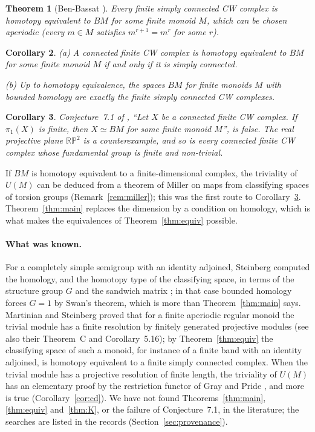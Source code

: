 \documentclass[11pt,a4paper]{article}
\newtheorem{theorem}{Theorem}[section]
\newtheorem{corollary}[theorem]{Corollary}
\theoremstyle{definition}
\newcommand{\RP}{\mathbb{RP}}
\begin{document}
\begin{theorem}[Ben-Bassat {\cite[Theorem~C]{BB}}]\label{thm:BB}
Every finite simply connected CW complex is homotopy equivalent to $BM$ for
some finite monoid $M$, which can be chosen aperiodic \textup{(}every $m\in M$
satisfies $m^{r+1}=m^r$ for some $r$\textup{)}.
\end{theorem}

\begin{corollary}\label{cor:class}
\textup{(a)} A connected finite CW complex is homotopy equivalent to $BM$ for
some finite monoid $M$ if and only if it is simply connected.

\textup{(b)} Up to homotopy equivalence, the spaces $BM$ for finite monoids
$M$ with bounded homology are exactly the finite simply connected CW
complexes.
\end{corollary}

\begin{corollary}\label{cor:conj}
Conjecture~7.1 of \cite{BB}, ``Let $X$ be a connected finite CW complex. If
$\pi_1(X)$ is finite, then $X\simeq BM$ for some finite monoid $M$'', is
false. The real projective plane $\RP^2$ is a counterexample, and so is every
connected finite CW complex whose fundamental group is finite and non-trivial.
\end{corollary}

If $BM$ is homotopy equivalent to a finite-dimensional complex, the
triviality of $U(M)$ can be deduced from a theorem of Miller on maps from
classifying spaces of torsion groups (Remark~\ref{rem:miller}); this was the
first route to Corollary~\ref{cor:conj}. Theorem~\ref{thm:main} replaces the
dimension by a condition on homology, which is what makes the equivalences of
Theorem~\ref{thm:equiv} possible.

\paragraph{What was known.} For a completely simple semigroup with an
identity adjoined, Steinberg computed the homology, and the homotopy type of
the classifying space, in terms of the structure group $G$ and the sandwich
matrix \cite[Theorem~A and Theorem~3.1]{St}; in that case bounded homology
forces $G=1$ by Swan's theorem, which is more than Theorem~\ref{thm:main}
says. Martinian and Steinberg proved that for a finite aperiodic regular
monoid the trivial module has a finite resolution by finitely generated
projective modules \cite[Corollary~5.15]{MS} (see also their Theorem~C and
Corollary~5.16); by Theorem~\ref{thm:equiv} the classifying space of such a
monoid, for instance of a finite band with an identity adjoined, is homotopy
equivalent to a finite simply connected complex. When the trivial module has
a projective resolution of finite length, the triviality of $U(M)$ has an
elementary proof by the restriction functor of Gray and Pride \cite{GP}, and
more is true (Corollary~\ref{cor:cd}). We have not found
Theorems~\ref{thm:main}, \ref{thm:equiv} and~\ref{thm:K}, or the failure of
Conjecture~7.1, in the literature; the searches are listed in the records
(Section~\ref{sec:provenance}).
\end{document}
